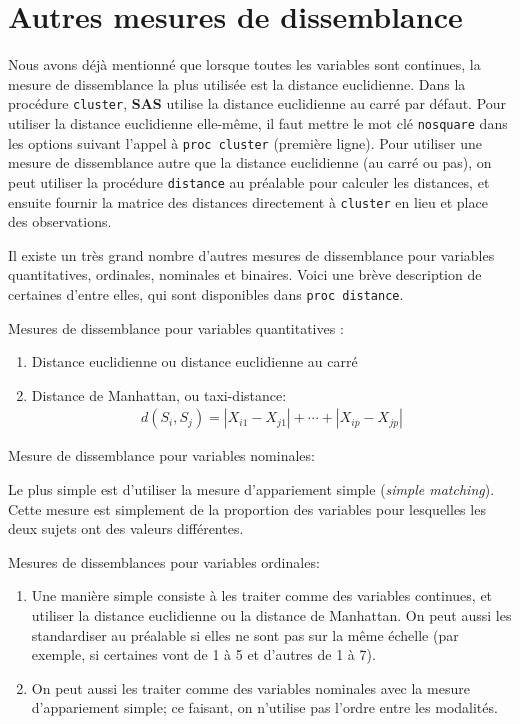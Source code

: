 \documentclass[
  11pt,
  letterpaper,
]{book}
\providecommand{\tightlist}{%
  \setlength{\itemsep}{0pt}\setlength{\parskip}{0pt}}
\theoremstyle{definition}
\theoremstyle{definition}
\theoremstyle{definition}
\theoremstyle{remark}
\begin{document}
\hypertarget{autres-mesures-de-dissemblance}{%
\section{Autres mesures de dissemblance}\label{autres-mesures-de-dissemblance}}

Nous avons déjà mentionné que lorsque toutes les variables sont continues, la mesure de dissemblance la plus utilisée est la distance euclidienne. Dans la procédure \texttt{cluster}, \textbf{SAS} utilise la distance euclidienne au carré par défaut. Pour utiliser la distance euclidienne elle-même, il faut mettre le mot clé \texttt{nosquare} dans les options suivant l'appel à \texttt{proc\ cluster} (première ligne). Pour utiliser une mesure de dissemblance autre que la distance euclidienne (au carré ou pas), on peut utiliser la procédure \texttt{distance} au préalable pour calculer les distances, et ensuite fournir la matrice des distances directement à \texttt{cluster} en lieu et place des observations.

Il existe un très grand nombre d'autres mesures de dissemblance pour variables quantitatives, ordinales, nominales et binaires. Voici une brève description de certaines d'entre elles, qui sont disponibles dans \texttt{proc\ distance}.

Mesures de dissemblance pour variables quantitatives :

\begin{enumerate}
\def\labelenumi{\arabic{enumi})}
\tightlist
\item
  Distance euclidienne ou distance euclidienne au carré
\item
  Distance de Manhattan, ou taxi-distance:
  \begin{align*}
  d(S_i, S_j) = |X_{i1}-X_{j1}| + \cdots + |X_{ip}- X_{jp}|
  \end{align*}
\end{enumerate}

Mesure de dissemblance pour variables nominales:

Le plus simple est d'utiliser la mesure d'appariement simple (\emph{simple matching}). Cette mesure est simplement de la proportion des variables pour lesquelles les deux sujets ont des valeurs différentes.

Mesures de dissemblances pour variables ordinales:

\begin{enumerate}
\def\labelenumi{\arabic{enumi})}
\tightlist
\item
  Une manière simple consiste à les traiter comme des variables continues, et utiliser la distance euclidienne ou la distance de Manhattan. On peut aussi les standardiser au préalable si elles ne sont pas sur la même échelle (par exemple, si certaines vont de 1 à 5 et d'autres de 1 à 7).
\item
  On peut aussi les traiter comme des variables nominales avec la mesure d'appariement simple; ce faisant, on n'utilise pas l'ordre entre les modalités.
\end{enumerate}
\end{document}
